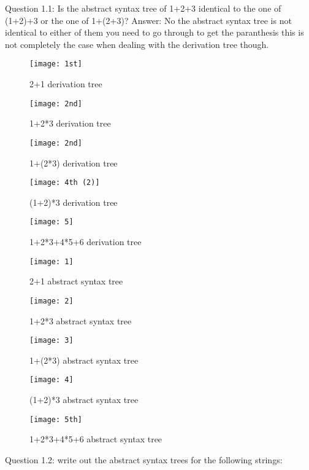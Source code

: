 \documentclass{article}
\theoremstyle{theorem}
\theoremstyle{definition}
\theoremstyle{remark}
\begin{document}
\begin{enumerate}
\begin{enumerate}
\begin{enumerate}
\begin{enumerate}
    \end{enumerate}
    Question 1.1:
    Is the abstract syntax tree of 1+2+3 identical to the one of (1+2)+3 or the one of 1+(2+3)?
    Answer: No the abstract syntax tree is not identical to either of them you need to go through to get the paranthesis this is not completely the case when dealing with the derivation tree though.
 \begin{figure}[htp]
    \centering
    \texttt{[image: 1st]}
    \caption{ 2+1  derivation tree}
    \label{fig: 2+1}
\end{figure}
 \begin{figure}[htp]
    \centering
    \texttt{[image: 2nd]}
    \caption{1+2*3  derivation tree}
    \label{fig:1+2*3}
\end{figure}
 \begin{figure}[htp]
    \centering
    \texttt{[image: 2nd]}
    \caption{1+(2*3)  derivation tree}
    \label{fig:1+(2*3)}
\end{figure}
 \begin{figure}[htp]
    \centering
    \texttt{[image: 4th (2)]}
    \caption{(1+2)*3  derivation tree}
    \label{fig:(1+2)*3}
\end{figure}
 \begin{figure}[htp]
    \centering
    \texttt{[image: 5]}
    \caption{1+2*3+4*5+6  derivation tree}
    \label{fig:1+2*3+4*5+6}
\end{figure}



 \begin{figure}[htp]
    \centering
    \texttt{[image: 1]}
    \caption{ 2+1  abstract syntax tree}
    \label{fig: 2+1}
\end{figure}
 \begin{figure}[htp]
    \centering
    \texttt{[image: 2]}
    \caption{1+2*3  abstract syntax tree}
    \label{fig:1+2*3}
\end{figure}
 \begin{figure}[htp]
    \centering
    \texttt{[image: 3]}
    \caption{1+(2*3)  abstract syntax tree}
    \label{fig:1+(2*3)}
\end{figure}
 \begin{figure}[htp]
    \centering
    \texttt{[image: 4]}
    \caption{(1+2)*3 abstract syntax tree}
    \label{fig:(1+2)*3}
\end{figure}
 \begin{figure}[htp]
    \centering
    \texttt{[image: 5th]}
    \caption{1+2*3+4*5+6  abstract syntax tree}
    \label{fig:1+2*3+4*5+6}
\end{figure}
Question 1.2:
    write out the abstract syntax trees for the following strings:



\end{enumerate}
\end{enumerate}
\end{enumerate}
\end{document}
